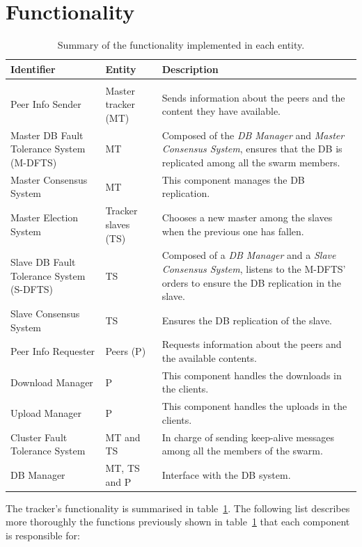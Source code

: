 \documentclass[twoside,a4paper,10pt]{article}
\begin{document}
\section{Functionality}

\begin{table}
  \centering
  \begin{tabularx}{\linewidth}{l l X}
    Identifier & Entity & Description \\ \hline\hline \\
    Peer Info Sender & Master tracker (MT) & Sends information about the peers
    and the content they have available. \\
    Master DB Fault Tolerance System (M-DFTS) & MT & Composed of the
    \emph{DB Manager} and \emph{Master Consensus System}, ensures that the
    DB is replicated among all the swarm members.\\
    Master Consensus System & MT & This component manages the DB
    replication.\\
    Master Election System & Tracker slaves (TS) & Chooses a new master among
    the slaves when the previous one has fallen.\\
    Slave DB Fault Tolerance System (S-DFTS) & TS & Composed of a
    \emph{DB Manager} and a \emph{Slave Consensus System}, listens to the
    M-DFTS' orders to ensure the DB replication in the slave.\\
    Slave Consensus System & TS &  Ensures the DB replication of
    the slave.\\
    Peer Info Requester & Peers (P) & Requests information about the peers and
    the available contents.\\
    Download Manager & P & This component handles the downloads in the
    clients.\\
    Upload Manager & P & This component handles the uploads in the clients. \\
    Cluster Fault Tolerance System & MT and TS &
    In charge of sending keep-alive messages among all the members of the
    swarm.\\
    DB Manager & MT, TS and P & Interface with the
    DB system.\\
  \end{tabularx}
  \caption{\label{tab:fun-entities}Summary of the functionality
    implemented in each entity.}
\end{table}

The tracker's functionality is summarised in table~\ref{tab:fun-entities}.
The following list describes more thoroughly the functions previously shown in
table~\ref{tab:fun-entities} that each component is responsible for:
\end{document}

